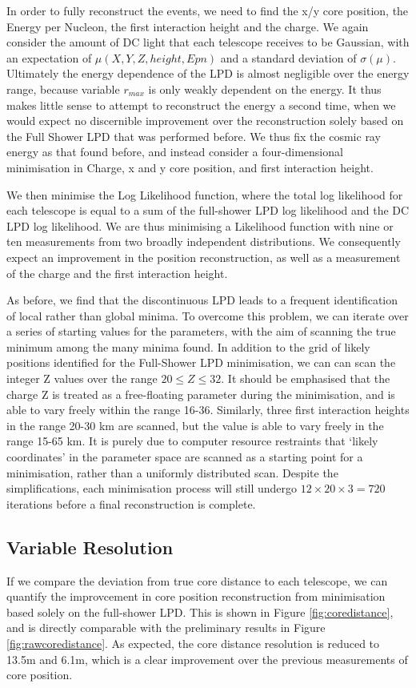 \documentclass[11pt]{article}
\begin{document}
In order to fully reconstruct the events, we need to find the x/y core position, the Energy per Nucleon, the first interaction height and the charge. We again consider the amount of DC light that each telescope receives to be Gaussian, with an expectation of $\mu(X, Y, Z, height, Epn)$ and a standard deviation of $\sigma(\mu)$. Ultimately the energy dependence of the LPD is almost negligible over the energy range, because variable $r_{max}$ is only weakly dependent on the energy. It thus makes little sense to attempt to reconstruct the energy a second time, when we would expect no discernible improvement over the reconstruction solely based on the Full Shower LPD that was performed before. We thus fix the cosmic ray energy as that found before, and instead consider a four-dimensional minimisation in Charge, x and y core position, and first interaction height.

We then minimise the Log Likelihood function, where the total log likelihood for each telescope is equal to a sum of the full-shower LPD log likelihood and the DC LPD log likelihood. We are thus minimising a Likelihood function with nine or ten measurements from two broadly independent distributions. We consequently expect an improvement in the position reconstruction, as well as a measurement of the charge and the first interaction height.

As before, we find that the discontinuous LPD leads to a frequent identification of local rather than global minima. To overcome this problem, we can iterate over a series of starting values for the parameters, with the aim of scanning the true minimum among the many minima found. In addition to the grid of likely positions identified for the Full-Shower LPD minimisation, we can can scan the integer Z values over the range $ 20 \leq Z \leq 32 $. It should be emphasised that the charge Z is treated as a free-floating parameter during the minimisation, and is able to vary freely within the range 16-36. Similarly, three first interaction heights in the range 20-30 km are scanned, but the value is able to vary freely in the range 15-65 km. It is purely due to computer resource restraints that \textquoteleft likely coordinates' in the parameter space are scanned as a starting point for a minimisation, rather than a uniformly distributed scan. Despite the simplifications, each minimisation process will still undergo $12 \times 20 \times 3 = 720$ iterations before a final reconstruction is complete. 

\subsection{Variable Resolution}
If we compare the deviation from true core distance to each telescope, we can quantify the improvcement in core position reconstruction from minimisation based solely on the full-shower LPD. This is shown in Figure \ref{fig:coredistance}, and is directly comparable with the preliminary results in Figure \ref{fig:rawcoredistance}. As expected, the core distance resolution is reduced to 13.5m and 6.1m, which is a clear improvement over the previous measurements of core position. 
\end{document}

